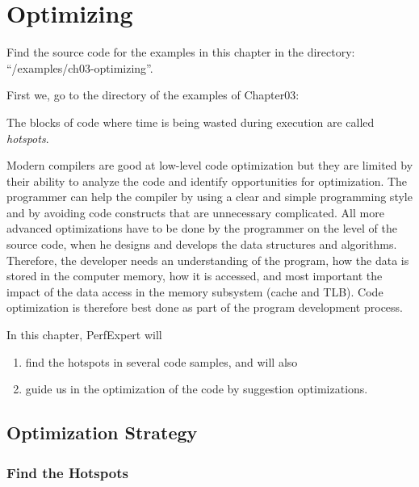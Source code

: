 \chapter{Optimizing}
\label{ch:ch03_optimizing}

\renewcommand{\exampledir}{examples/ch03-optimizing}

\begin{tip}
Find the source code for the examples in this chapter in the directory:  ``\tilde/\exampledir''.
\end{tip}

First we, go to the directory of the examples of Chapter03:

\begin{prompt}
\end{prompt}

The blocks of code where time is being wasted during execution are called \emph{hotspots}.

Modern compilers are good at low-level code optimization but they are limited by their ability to analyze the code and identify opportunities for optimization. The programmer can help the compiler by using a clear and simple programming style and by avoiding code constructs that are unnecessary complicated. All more advanced optimizations have to be done by the programmer on the level of the source code, when he designs and develops the data structures and algorithms. Therefore, the developer needs an understanding of the program, how the data is stored in the computer memory, how it is accessed, and most important the impact of the data access in the memory subsystem (cache and TLB). Code optimization is therefore best done as part of the program development process.

In this chapter, PerfExpert will

\begin{enumerate}
  \item  find the hotspots in several code samples, and will also
  \item  guide us in the optimization of the code by suggestion optimizations.
\end{enumerate}

\section{Optimization Strategy}
\label{sec:Optimization_Strategy}

\subsection{Find the Hotspots}
\label{subsec:Hotspots}


